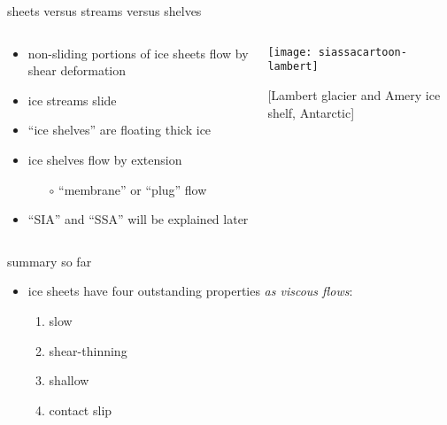\documentclass{beamer}
\begin{document}
\begin{frame}{sheets versus streams versus shelves}

\begin{columns}
\begin{column}{0.35\textwidth}
\small
\begin{itemize}
\small
\item non-sliding portions of ice sheets flow by shear deformation
\item ice streams slide
\item ``ice shelves'' are floating thick ice
\item ice shelves flow by extension
  \begin{itemize}
  \scriptsize
  \item[$\circ$] ``membrane'' or ``plug'' flow
  \end{itemize}
\item ``SIA'' and ``SSA'' will be explained later
\end{itemize}
\end{column}

\begin{column}{0.65\textwidth}
\texttt{[image: siassacartoon-lambert]}

\begin{center}
\vspace{-0.18in}
\tiny [Lambert glacier and Amery ice shelf, Antarctic]
\end{center}
\end{column}
\end{columns}
\end{frame}


\begin{frame}{summary so far}

\begin{itemize}
\item ice sheets have four outstanding properties \emph{as viscous flows}:
  \begin{enumerate}
  \item \alert{slow}
  \item \alert{shear-thinning}
  \item \alert{shallow}
  \item \alert{contact slip}
  \end{enumerate}
\end{itemize}
\end{frame}
\end{document}
